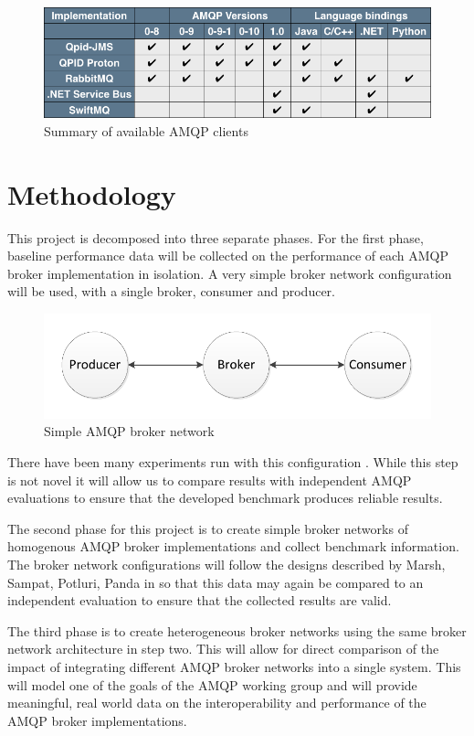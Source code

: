 \documentclass{thesis}
\begin{document}
\begin{figure}[h]
\centering
\includegraphics[scale=.5]{client_comparision}  
\caption{Summary of available AMQP clients}
\end{figure}

\chapter{Methodology}
This project is decomposed into three separate phases.  For the first phase, baseline performance data will be collected on the performance of each AMQP broker implementation in isolation.  A very simple broker network configuration will be used, with a single broker, consumer and producer.

\begin{figure}[h]
\centering
\includegraphics[scale=.75]{direct_connect}  
\caption{Simple AMQP broker network}
\end{figure}

There have been many experiments run with this configuration \cite{BENCHMARK1} \cite{BENCHMARK2}.  While this step is not novel it will allow us to compare results with independent AMQP evaluations to ensure that the developed benchmark produces reliable results. 

The second phase for this project is to create simple broker networks of homogenous AMQP broker implementations and collect benchmark information.  The broker network configurations will follow the designs described by Marsh, Sampat, Potluri, Panda in \cite{Scaling AMQP} so that this data may again be compared to an independent evaluation to ensure that the collected results are valid.

The third phase is to create heterogeneous broker networks using the same broker network architecture in step two.  This will allow for direct comparison of the impact of integrating different AMQP broker networks into a single system.  This will model one of the goals of the AMQP working group and will provide meaningful, real world data on the interoperability and performance of the AMQP broker implementations. 
\end{document}
